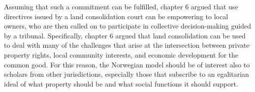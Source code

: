 Assuming that such a commitment can be fulfilled, chapter 6 argued that use directives issued by a land consolidation court can be empowering to local owners, who are then called on to participate in collective decision-making guided by a tribunal. Specifically, chapter 6 argued that land consolidation can be used to deal with many of the challenges that arise at the intersection between private property rights, local community interests, and economic development for the common good. For this reason, the Norwegian model should be of interest also to scholars from other jurisdictions, especially those that subscribe to an egalitarian ideal of what property should be and what social functions it should support.

